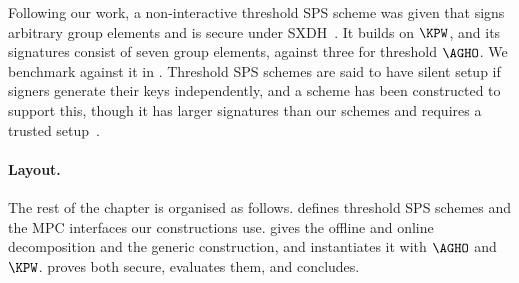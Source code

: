 Following our work, a non-interactive threshold SPS scheme was given that signs
arbitrary group elements and is secure under SXDH~\cite{PKC:MMSST24}. It builds
on $\KPW$, and its signatures consist of seven group elements, against three
for threshold $\AGHO$. We benchmark against it in .
Threshold SPS schemes are said to have silent setup if signers generate their
keys independently, and a scheme has been constructed to support this, though
it has larger signatures than our schemes and requires a trusted setup~\cite{EPRINT:GGPR25}.

\paragraph{Layout.} The rest of the chapter is organised as follows.
 defines threshold SPS schemes and the MPC
interfaces our constructions use.   gives the
offline and online decomposition and the generic construction, and
 instantiates it with $\AGHO$ and $\KPW$.
 proves both secure, 
evaluates them, and  concludes.
